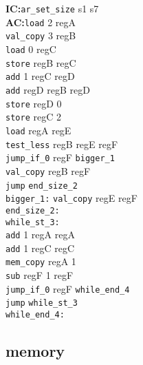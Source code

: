 \documentclass[10pt,landscape]{article}
\begin{document}
\begin{multicols}{3}
\begin{minipage}{0.2 	\textwidth}
		\textbf{IC:}\verb!ar_set_size! s1 s7 \\
		\textbf{AC:}\verb!load! 2 regA\\
		\verb!val_copy! 3 regB \\
		\verb!load! 0 regC\\
		\verb!store! regB regC\\
		\verb!add! 1 regC regD\\
		\verb!add! regD regB regD\\
		\verb!store! regD 0\\
		\verb!store! regC 2\\
		\verb!load! regA regE\\
		\verb!test_less! regB regE regF\\
		\verb!jump_if_0! regF \verb!bigger_1!\\
		\verb!val_copy! regB regF \\
		\verb!jump!  \verb!end_size_2!\\
		\verb!bigger_1:!
		\verb!val_copy! regE regF \\
		\verb!end_size_2:!\\
		\verb!while_st_3:!\\
		\verb!add! 1 regA regA\\
		\verb!add! 1 regC regC\\
		\verb!mem_copy! regA 1\\
		\verb!sub! regF 1 regF\\
		\verb!jump_if_0! regF \verb!while_end_4!\\
		\verb!jump! \verb!while_st_3!\\
		\verb!while_end_4:!\\
	\end{minipage}%
	\begin{minipage}{0.2\textwidth}
		\subsection{memory}


\end{minipage}
\end{multicols}
\end{document}
